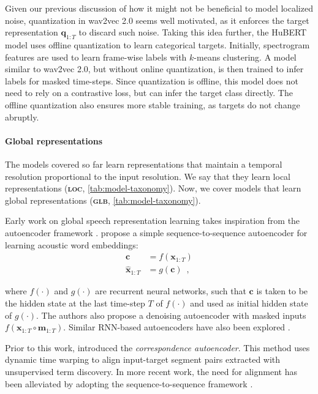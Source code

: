 {Given our previous discussion of how it might not be beneficial to model localized noise, quantization in wav2vec 2.0 seems well motivated, as it enforces the target representation $\mathbf{q}_{1:T}$ to discard such noise. Taking this idea further, the HuBERT model \parencite{hsu_hubert_2021} uses offline quantization to learn categorical targets. Initially, spectrogram features are used to learn frame-wise labels with $k$-means clustering. A model similar to wav2vec 2.0, but without online quantization, is then trained to infer labels for masked time-steps. Since quantization is offline, this model does not need to rely on a contrastive loss, but can infer the target class directly. The offline quantization also ensures more stable training, as targets do not change abruptly.


\paragraph{Global representations}
The models covered so far learn representations that maintain a temporal resolution proportional to the input resolution. We say that they learn local representations (\textbf{\textsc{loc}}, \cref{tab:model-taxonomy}). Now, we cover models that learn global representations (\textbf{\textsc{glb}}, \cref{tab:model-taxonomy}).
 
Early work on global speech representation learning takes inspiration from the autoencoder framework \parencite{kramer_nonlinear_1991}. \textcite{chung_audio_2016} propose a simple sequence-to-sequence autoencoder for learning acoustic word embeddings:
\begin{align}\label{eq_brief:dec-aw2v}
    \mathbf{c} &= f(\mathbf{x}_{1:T}) \\
    \hat{\mathbf{x}}_{1:T} &= g(\mathbf{c}) \enspace ,
\end{align}

\noindent where $f(\cdot)$ and $g(\cdot)$ are recurrent neural networks, such that $\mathbf{c}$ is taken to be the hidden state at the last time-step $T$ of $f(\cdot)$ and used as initial hidden state of $g(\cdot)$. 
The authors also propose a denoising autoencoder with masked inputs $f(\mathbf{x}_{1:T} \circ \mathbf{m}_{1:T})$. Similar RNN-based autoencoders have also been explored \parencite{kamper_truly_2019, holzenberger_learning_2018}.

Prior to this work, \textcite{kamper_unsupervised_2015, renshaw_comparison_2015} introduced the \textit{correspondence autoencoder}. This method uses dynamic time warping to align input-target segment pairs extracted with unsupervised term discovery. In more recent work, the need for alignment has been alleviated by adopting the sequence-to-sequence framework \parencite{kamper_truly_2019, jacobs_acoustic_2021}.

}
